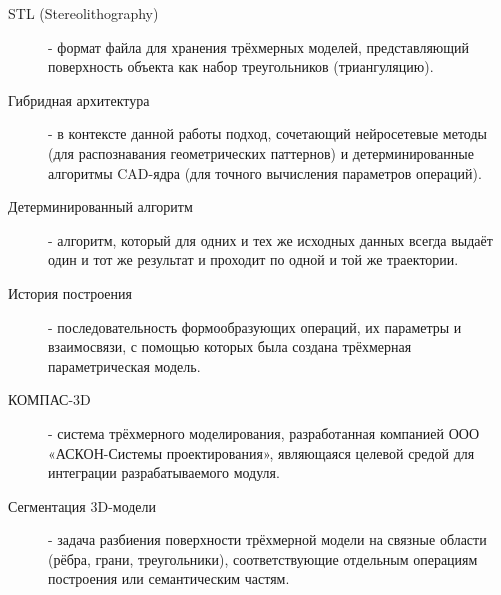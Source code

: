 \begin{description}
    \item[STL (Stereolithography)] - формат файла для хранения трёхмерных моделей, представляющий поверхность объекта как набор треугольников (триангуляцию).
    \item[Гибридная архитектура] - в контексте данной работы подход, сочетающий нейросетевые методы (для распознавания геометрических паттернов) и детерминированные алгоритмы CAD-ядра (для точного вычисления параметров операций).
    \item[Детерминированный алгоритм] - алгоритм, который для одних и тех же исходных данных всегда выдаёт один и тот же результат и проходит по одной и той же траектории.
    \item[История построения] - последовательность формообразующих операций, их параметры и взаимосвязи, с помощью которых была создана трёхмерная параметрическая модель.
    \item[КОМПАС-3D] - система трёхмерного моделирования, разработанная компанией ООО «АСКОН-Системы проектирования», являющаяся целевой средой для интеграции разрабатываемого модуля.
    \item[Сегментация 3D-модели] - задача разбиения поверхности трёхмерной модели на связные области (рёбра, грани, треугольники), соответствующие отдельным операциям построения или семантическим частям.
\end{description}

